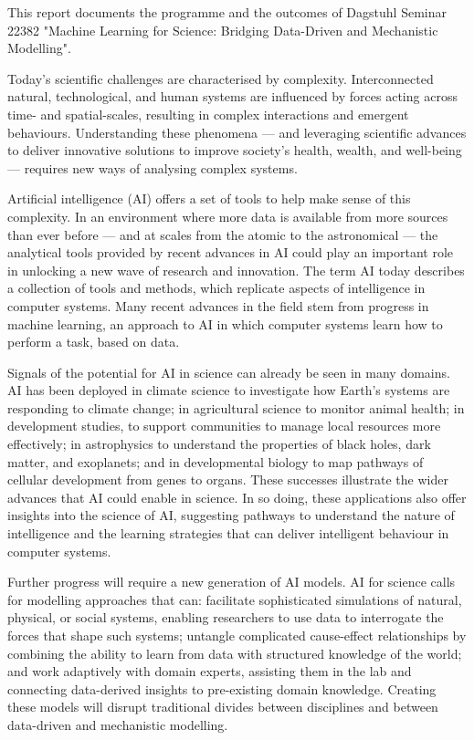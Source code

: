 This report documents the programme and the outcomes of Dagstuhl Seminar 22382 "Machine Learning for Science: Bridging Data-Driven and Mechanistic Modelling".

Today's scientific challenges are characterised by complexity.
Interconnected natural, technological, and human systems are influenced
by forces acting across time- and spatial-scales, resulting in complex
interactions and emergent behaviours. Understanding these phenomena ---
and leveraging scientific advances to deliver innovative solutions to
improve society's health, wealth, and well-being --- requires new ways of
analysing complex systems.


Artificial intelligence (AI) offers a set of tools to help make sense of
this complexity. In an environment where more data is available from
more sources than ever before --- and at scales from the atomic to the
astronomical --- the analytical tools provided by recent advances in AI
could play an important role in unlocking a new wave of research and
innovation. The term AI today describes a collection of tools and
methods, which replicate aspects of intelligence in computer systems.
Many recent advances in the field stem from progress in machine
learning, an approach to AI in which computer systems learn how to
perform a task, based on data.

Signals of the potential for AI in science can already be seen in many
domains. AI has been deployed in climate science to investigate how
Earth's systems are responding to climate change; in agricultural
science to monitor animal health; in development studies, to support
communities to manage local resources more effectively; in astrophysics
to understand the properties of black holes, dark matter, and
exoplanets; and in developmental biology to map pathways of cellular
development from genes to organs. These successes illustrate the wider
advances that AI could enable in science. In so doing, these
applications also offer insights into the science of AI, suggesting
pathways to understand the nature of intelligence and the learning
strategies that can deliver intelligent behaviour in computer systems.

Further progress will require a new generation of AI models. AI for
science calls for modelling approaches that can: facilitate
sophisticated simulations of natural, physical, or social systems,
enabling researchers to use data to interrogate the forces that shape
such systems; untangle complicated cause-effect relationships by
combining the ability to learn from data with structured knowledge of
the world; and work adaptively with domain experts, assisting them in
the lab and connecting data-derived insights to pre-existing domain
knowledge. Creating these models will disrupt traditional divides
between disciplines and between data-driven and mechanistic modelling.

